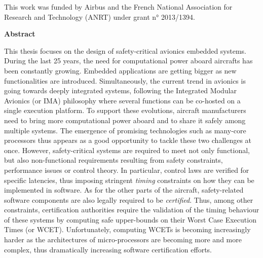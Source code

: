 \documentclass[main.tex]{subfiles}
\begin{document}
%
%
%
%
%
%

\mbox{}\vspace{8cm}
\begin{center}
    \large
    This work was funded by Airbus and the French National Association for
    Research and Technology (ANRT) under grant n° 2013/1394.
\end{center}

\cleardoublepage

\begin{center} \LARGE \bf
Abstract
\vspace{5mm} \end{center}
This thesis focuses on the design of safety-critical avionics embedded systems.
During the last 25 years, the need for computational power aboard aircrafts has
been constantly growing. Embedded applications are getting bigger as new
functionalities are introduced. Simultaneously, the current trend in avionics is
going towards deeply integrated systems, following the Integrated Modular
Avionics (or IMA) philosophy where several functions can be co-hosted on a
single execution platform. To support these evolutions, aircraft manufacturers
need to bring more computational power aboard and to share it safely among
multiple systems. The emergence of promising technologies such as many-core
processors thus appears as a good opportunity to tackle these two challenges at
once.  However, safety-critical systems are required to meet not only
functional, but also non-functional requirements resulting from safety
constraints, performance issues or control theory. In particular, control laws
are verified for specific latencies, thus imposing stringent \emph{timing}
constraints on how they can be implemented in software. As for the other parts
of the aircraft, safety-related software components are also legally required to
be \emph{certified}. Thus, among other constraints, certification authorities
require the validation of the timing behaviour of these systems by computing
safe upper-bounds on their Worst Case Execution Times (or WCET). Unfortunately,
computing WCETs is becoming increasingly harder as the architectures of
micro-processors are becoming more and more complex, thus dramatically
increasing software certification efforts.\\
\end{document}
